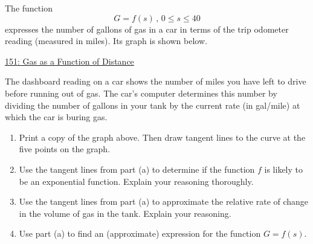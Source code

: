 \documentclass{ximera}
\begin{document}
\begin{question} \label{Qffr3redf4zx}
The function
\[
 G = f(s) \, , \, 0\leq s \leq 40
\]
expresses the number of gallons of gas in a car in terms of the trip odometer reading (measured in miles). Its graph is shown below.

\begin{onlineOnly}
    \begin{center}
\end{center}
\end{onlineOnly}

\href{https://www.desmos.com/calculator/7dwuysdgdb}{151: Gas as a Function of Distance}


The dashboard reading on a car shows the number of miles you have left to drive before running out of gas. The car's computer determines this number by dividing the number of gallons in your tank by the current rate (in gal/mile) at which the car is buring gas.

\begin{enumerate}
\item Print a copy of the graph above. Then draw tangent lines to the curve at the five points on the graph.

\item Use the tangent lines from part (a) to determine if the function $f$ is likely to be an exponential function. Explain your reasoning thoroughly.

\item Use the tangent lines from part (a) to approximate the relative rate of change in the volume of gas in the tank. Explain your reasoning.

\item Use part (a) to find an (approximate) expression for the function $G=f(s)$.

\end{enumerate}

\end{question}
\end{document}
